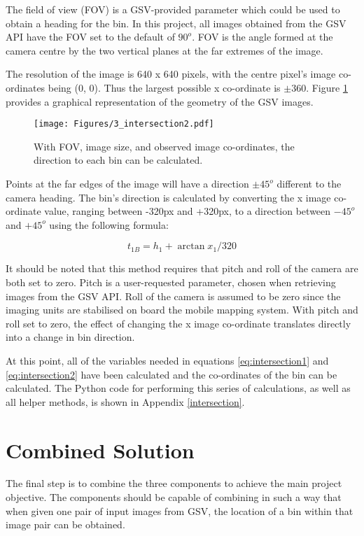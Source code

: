 The field of view (FOV) is a GSV-provided parameter which could be used to obtain a heading for the bin. In this project, all images obtained from the GSV API have the FOV set to the default of $90^o$. FOV is the angle formed at the camera centre by the two vertical planes at the far extremes of the image.

The resolution of the image is 640 x 640 pixels, with the centre pixel's image co-ordinates being (0, 0). Thus the largest possible x co-ordinate is $\pm360$. Figure \ref{fig:bin_direction} provides a graphical representation of the geometry of the GSV images.

\begin{figure}[H]
\centering
\texttt{[image: Figures/3\_intersection2.pdf]}
\decoRule
\caption[Calculating Direction to Bin]{With FOV, image size, and observed image co-ordinates, the direction to each bin can be calculated.}
\label{fig:bin_direction}
\end{figure}

Points at the far edges of the image will have a direction $\pm45^o$ different to the camera heading. The bin's direction is calculated by converting the x image co-ordinate value, ranging between -320px and +320px, to a direction between $-45^o$ and $+45^o$ using the following formula:

\begin{equation}
    t_{1B} = h_1 + \arctan{x_1/320}
\end{equation}

It should be noted that this method requires that pitch and roll of the camera are both set to zero. Pitch is a user-requested parameter, chosen when retrieving images from the GSV API. Roll of the camera is assumed to be zero since the imaging units are stabilised on board the mobile mapping system. With pitch and roll set to zero, the effect of changing the x image co-ordinate translates directly into a change in bin direction.

At this point, all of the variables needed in equations \ref{eq:intersection1} and \ref{eq:intersection2} have been calculated and the co-ordinates of the bin can be calculated. The Python code for performing this series of calculations, as well as all helper methods, is shown in Appendix \ref{intersection}.



\section{Combined Solution}
The final step is to combine the three components to achieve the main project objective. The components should be capable of combining in such a way that when given one pair of input images from GSV, the location of a bin within that image pair can be obtained.

